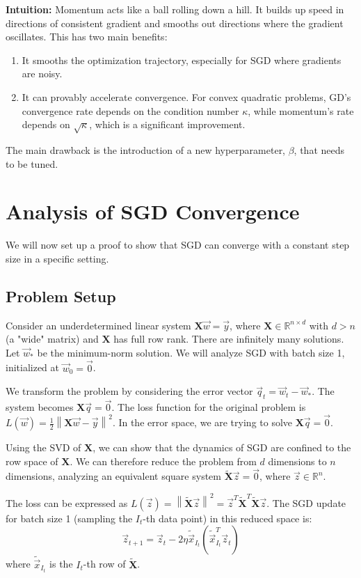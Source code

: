 \documentclass[11pt]{article}
\newcommand{\R}{\mathbb{R}}
\newcommand{\mat}[1]{\mathbf{#1}}
\newcommand{\norm}[1]{\left\lVert#1\right\rVert}
\begin{document}
\textbf{Intuition:} Momentum acts like a ball rolling down a hill. It builds up speed in directions of consistent gradient and smooths out directions where the gradient oscillates. This has two main benefits:
\begin{enumerate}
    \item It smooths the optimization trajectory, especially for SGD where gradients are noisy.
    \item It can provably accelerate convergence. For convex quadratic problems, GD's convergence rate depends on the condition number $\kappa$, while momentum's rate depends on $\sqrt{\kappa}$, which is a significant improvement.
\end{enumerate}
The main drawback is the introduction of a new hyperparameter, $\beta$, that needs to be tuned.

\section{Analysis of SGD Convergence}
We will now set up a proof to show that SGD can converge with a constant step size in a specific setting.

\subsection{Problem Setup}
Consider an underdetermined linear system $\mat{X}\vec{w} = \vec{y}$, where $\mat{X} \in \R^{n \times d}$ with $d > n$ (a "wide" matrix) and $\mat{X}$ has full row rank. There are infinitely many solutions. Let $\vec{w}_{*}$ be the minimum-norm solution. We will analyze SGD with batch size 1, initialized at $\vec{w}_0 = \vec{0}$.

We transform the problem by considering the error vector $\vec{q}_t = \vec{w}_t - \vec{w}_{*}$. The system becomes $\mat{X}\vec{q} = \vec{0}$.
The loss function for the original problem is $L(\vec{w}) = \frac{1}{2}\norm{\mat{X}\vec{w}-\vec{y}}^2$. In the error space, we are trying to solve $\mat{X}\vec{q}=\vec{0}$.

Using the SVD of $\mat{X}$, we can show that the dynamics of SGD are confined to the row space of $\mat{X}$. We can therefore reduce the problem from $d$ dimensions to $n$ dimensions, analyzing an equivalent square system $\tilde{\mat{X}}\vec{z} = \vec{0}$, where $\vec{z} \in \R^n$.

The loss can be expressed as $L(\vec{z}) = \norm{\tilde{\mat{X}}\vec{z}}^2 = \vec{z}^T \tilde{\mat{X}}^T \tilde{\mat{X}} \vec{z}$. The SGD update for batch size 1 (sampling the $I_t$-th data point) in this reduced space is:
\begin{equation}
    \vec{z}_{t+1} = \vec{z}_t - 2\eta \tilde{\vec{x}}_{I_t} (\tilde{\vec{x}}_{I_t}^T \vec{z}_t)
\end{equation}
where $\tilde{\vec{x}}_{I_t}$ is the $I_t$-th row of $\tilde{\mat{X}}$.
\end{document}
